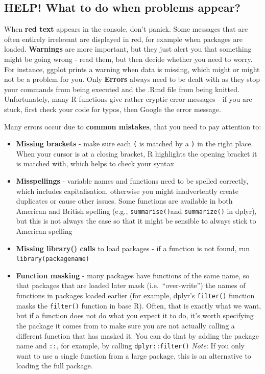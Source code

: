 \documentclass[
]{book}
\providecommand{\tightlist}{%
  \setlength{\itemsep}{0pt}\setlength{\parskip}{0pt}}
\begin{document}
\hypertarget{help-what-to-do-when-problems-appear}{%
\subsection{HELP! What to do when problems appear?}\label{help-what-to-do-when-problems-appear}}

When \textbf{red text} appears in the console, don't panick. Some messages that are often entirely irrelevant are displayed in red, for example when packages are loaded. \textbf{Warnings} are more important, but they just alert you that something might be going wrong - read them, but then decide whether you need to worry. For instance, ggplot prints a warning when data is missing, which might or might not be a problem for you. Only \textbf{Errors} always need to be dealt with as they stop your commands from being executed and the .Rmd file from being knitted. Unfortunately, many R functions give rather cryptic error messages - if you are stuck, first check your code for typos, then Google the error message.

Many errors occur due to \textbf{common mistakes}, that you need to pay attention to:

\begin{itemize}
\tightlist
\item
  \textbf{Missing brackets} - make sure each \texttt{(} is matched by a \texttt{)} in the right place. When your cursor is at a closing bracket, R highlights the opening bracket it is matched with, which helps to check your syntax
\item
  \textbf{Misspellings} - variable names and functions need to be spelled correctly, which includes capitalisation, otherwise you might inadvertently create duplicates or cause other issues. Some functions are available in both American and British spelling (e.g., \texttt{summarise()}and \texttt{summarize()} in dplyr), but this is not always the case so that it might be sensible to always stick to American spelling
\item
  \textbf{Missing library() calls} to load packages - if a function is not found, run \texttt{library(packagename)}
\item
  \textbf{Function masking} - many packages have functions of the same name, so that packages that are loaded later mask (i.e.~``over-write'') the names of functions in packages loaded earlier (for example, dplyr's \texttt{filter()} function masks the \texttt{filter()} function in base R). Often, that is exactly what we want, but if a function does not do what you expect it to do, it's worth specifying the package it comes from to make sure you are not actually calling a different function that has masked it. You can do that by adding the package name and \texttt{::}, for example, by calling \texttt{dplyr::filter()} \emph{Note}: If you only want to use a single function from a large package, this is an alternative to loading the full package.
\end{itemize}
\end{document}
